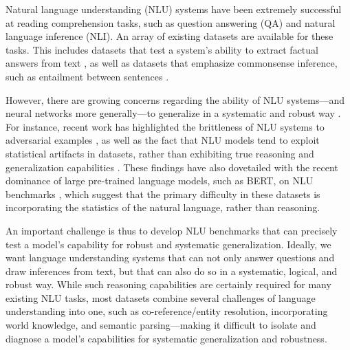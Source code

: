 \documentclass[letterpaper, 12pt]{report}
\begin{document}
Natural language understanding (NLU) systems have been extremely successful at reading comprehension tasks, such as question answering (QA) and natural language inference (NLI).
An array of existing datasets are available for these tasks. This includes datasets that test a system's ability to extract factual answers from text \cite{Rajpurkar2016-yc,Nguyen2016-ec,Trischler2016-fc,Mostafazadeh2016-hu,Su2016-so}, as well as datasets that emphasize commonsense inference, such as entailment between sentences \cite{bowman2015large,williams2018broad}.

However, there are growing concerns regarding the ability of NLU systems---and neural networks more generally---to generalize in a systematic and robust way \cite{bahdanau2018systematic,lake2017generalization,Johnson2016-mw}.
For instance, recent work has highlighted the brittleness of NLU systems to adversarial examples \cite{jia2017adversarial}, as well as the fact that NLU models tend to exploit statistical artifacts in datasets, rather than exhibiting true reasoning and generalization capabilities \cite{gururangan2018annotation,kaushik2018much}.
These findings have also dovetailed with the recent dominance of large pre-trained language models, such as BERT, on NLU benchmarks \cite{devlin2018bert,peters2018deep}, which suggest that the primary difficulty in these datasets is incorporating the statistics of the natural language, rather than reasoning.

An important challenge is thus to develop NLU benchmarks that can precisely test a model's capability for robust and systematic generalization.
Ideally, we want language understanding systems that can not only answer questions and draw inferences from text, but that can also do so in a systematic, logical, and robust way.
While such reasoning capabilities are certainly required for many existing NLU tasks, most datasets combine several challenges of language understanding into one, such as co-reference/entity resolution, incorporating world knowledge, and semantic parsing---making it difficult to isolate and diagnose a model's capabilities for systematic generalization and robustness.
\end{document}
